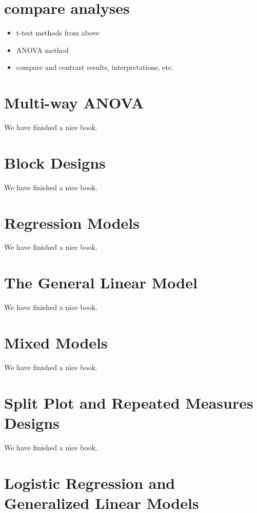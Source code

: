 \documentclass[]{book}
\providecommand{\tightlist}{%
  \setlength{\itemsep}{0pt}\setlength{\parskip}{0pt}}
\theoremstyle{definition}
\theoremstyle{definition}
\theoremstyle{definition}
\theoremstyle{remark}
\begin{document}
\chapter{compare analyses}\label{compare-analyses}

\begin{itemize}
\tightlist
\item
  t-test methods from above
\item
  ANOVA method
\item
  compare and contrast results, interpretations, etc.
\end{itemize}

\chapter{Multi-way ANOVA}\label{multiway}

We have finished a nice book.

\chapter{Block Designs}\label{block}

We have finished a nice book.

\chapter{Regression Models}\label{regression}

We have finished a nice book.

\chapter{The General Linear Model}\label{glm}

We have finished a nice book.

\chapter{Mixed Models}\label{mixedmodels}

We have finished a nice book.

\chapter{Split Plot and Repeated Measures
Designs}\label{repeatedmeasures}

We have finished a nice book.

\chapter{Logistic Regression and Generalized Linear
Models}\label{logistic}
\end{document}
